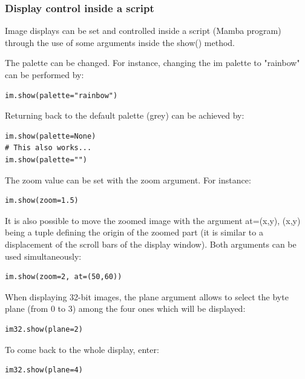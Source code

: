 \documentclass[a4paper,10pt,oneside]{article}
\begin{document}
\subsubsection{Display control inside a script}
\label{cha:dis_arguments}

Image displays can be set and controlled inside a script (Mamba program) through the use
of some arguments inside the show() method.

The palette can be changed. For instance, changing the im palette to "rainbow"
can be performed by:

\lstset{language=Python}
\begin{lstlisting}
im.show(palette="rainbow")
\end{lstlisting}

Returning back to the default palette (grey) can be achieved by:

\lstset{language=Python}
\begin{lstlisting}
im.show(palette=None)
# This also works...
im.show(palette="")
\end{lstlisting}

The zoom value can be set with the zoom argument. For instance:

\lstset{language=Python}
\begin{lstlisting}
im.show(zoom=1.5)
\end{lstlisting}

It is also possible to move the zoomed image with the argument at=(x,y), (x,y) being
a tuple defining the origin of the zoomed part (it is similar to a displacement of the
scroll bars of the display window). Both arguments can be used simultaneously:

\lstset{language=Python}
\begin{lstlisting}
im.show(zoom=2, at=(50,60))
\end{lstlisting}

When displaying 32-bit images, the plane argument allows to select the byte plane (from 0 to 3) among the
four ones which will be displayed:

\lstset{language=Python}
\begin{lstlisting}
im32.show(plane=2)
\end{lstlisting}

To come back to the whole display, enter:

\lstset{language=Python} 
\begin{lstlisting}
im32.show(plane=4)
\end{lstlisting}
\end{document}
